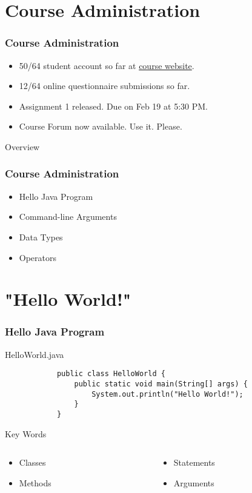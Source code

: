 \documentclass[10pt, compress]{beamer}
\begin{document}
\prepareCover

\section{Course Administration}

\begin{frame}[fragile]
	\frametitle{Course Administration}
	\begin{itemize}
		\item[] 50/64 student account so far at \href{http://ghorbanzade.com/}{course website}.
		\item[] 12/64 online questionnaire submissions so far.
		\item[] Assignment 1 released. Due on Feb 19 at 5:30 PM.
		\item[] Course Forum now available. Use it. Please.
	\end{itemize}
\end{frame}

\begin{frame}{Overview}
	\frametitle{Course Administration}
	\begin{itemize}
		\item[] Hello Java Program
		\item[] Command-line Arguments
		\item[] Data Types
		\item[] Operators
	\end{itemize}
\end{frame}

\section{"Hello World!"}

\begin{frame}[fragile]
	\frametitle{Hello Java Program}
	\begin{block}{HelloWorld.java}
		\begin{verbatim}
			public class HelloWorld {
			    public static void main(String[] args) {
			        System.out.println("Hello World!");
			    }
			}
		\end{verbatim}
	\end{block}
	\begin{block}{Key Words}
		\begin{columns}
		\begin{column}{0.5\textwidth}
			\begin{itemize}
				\item[] Classes
				\item[] Methods
			\end{itemize}
		\end{column}
		\begin{column}{0.5\textwidth}
			\begin{itemize}
				\item[] Statements
				\item[] Arguments
			\end{itemize}
		\end{column}
		\end{columns}
	\end{block}
\end{frame}
\end{document}
